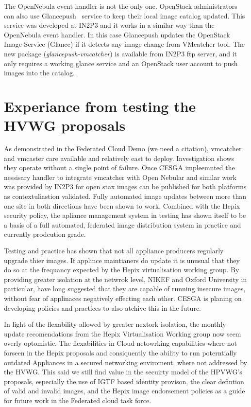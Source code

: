 \documentclass{llncs_Ibergrid2013}
\begin{document}
The OpenNebula event handler is not the only one. OpenStack administrators can also use Glancepush~\cite{glancepush} service to keep their local image catalog updated. 
This service was developed at IN2P3 and it works in a similar way than the OpenNebula event handler. 
In this case Glancepush updates the OpenStack Image Service (Glance) if it detects any image change from VMcatcher tool. 
The new package (\textit{glancepush-vmcatcher}) is available from IN2P3 ftp server, and it only requires a working glance service and an OpenStack user account to push images into the catalog.



\section{Experiance from testing the HVWG proposals}
\label{sect-experiances}
As demonstrated in the Federated Cloud Demo (we need a citation), vmcatcher and vmcaster care available and relatively east to deploy. Investigation shows they operate without a single point of failure. Once CESGA impleemnted the nessisary handler to integrate vmcatcher with Open Nebular and similar work was provided by IN2P3 for open stax images can be published for both platforms as contextuliastion validated. Fully automated image updates between more than one site in both directions have been shown to work. Combined with the Hepix security policy, the apliance management system in testing has shown itself to be a basis of a full automated, federated image distribution system in practice and currently prodcution grade.

Testing and practice has shown that not all appliance producers regularly upgrade thier images. If applince maintianers do update it is unusual that they do so at the frequancy expected by the Hepix virtualisation working group. By providing greater isolation at the netwrok level, NIKEF and Oxford University in particular, have long suggested that they are capable of running insecure images, without fear of applinaces negatively effecting each other. CESGA is planing on developing policies and practices to also atchive this in the future. 

In light of the flexability allowed by greater nextork isolation, the monthly update recomendations from the Hepix Virtualisation Working group now seem overly optomistic. The flexabilities in Cloud netowrking capabilities where not forseen in the Hepix proposals and consiquently the ability to run poterntially outdated Appliances in a secured networking enviroment, where not addressed by the HVWG. This said we still find value in the secuirty model of the HPVWG's proposals, especially the use of IGTF based identity provison, the clear defintion of valid and invalid images, and the Hepix image endorsement policies as a guide for future work in the Federated cloud task force.
\end{document}
